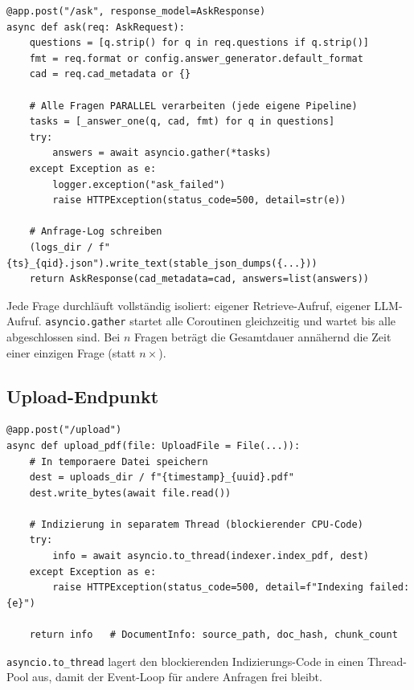 \documentclass[12pt, a4paper]{article}
\begin{document}
\begin{lstlisting}[style=pythonstyle, caption={Parallele Anfrageverarbeitung mit asyncio}]
@app.post("/ask", response_model=AskResponse)
async def ask(req: AskRequest):
    questions = [q.strip() for q in req.questions if q.strip()]
    fmt = req.format or config.answer_generator.default_format
    cad = req.cad_metadata or {}

    # Alle Fragen PARALLEL verarbeiten (jede eigene Pipeline)
    tasks = [_answer_one(q, cad, fmt) for q in questions]
    try:
        answers = await asyncio.gather(*tasks)
    except Exception as e:
        logger.exception("ask_failed")
        raise HTTPException(status_code=500, detail=str(e))

    # Anfrage-Log schreiben
    (logs_dir / f"{ts}_{qid}.json").write_text(stable_json_dumps({...}))
    return AskResponse(cad_metadata=cad, answers=list(answers))
\end{lstlisting}

\begin{infobox}
Jede Frage durchläuft vollständig isoliert: eigener Retrieve-Aufruf, eigener
LLM-Aufruf. \texttt{asyncio.gather} startet alle Coroutinen gleichzeitig und
wartet bis alle abgeschlossen sind. Bei $n$ Fragen beträgt die Gesamtdauer
annähernd die Zeit einer einzigen Frage (statt $n \times$).
\end{infobox}

\subsection{Upload-Endpunkt}

\begin{lstlisting}[style=pythonstyle, caption={PDF-Upload und Indizierung}]
@app.post("/upload")
async def upload_pdf(file: UploadFile = File(...)):
    # In temporaere Datei speichern
    dest = uploads_dir / f"{timestamp}_{uuid}.pdf"
    dest.write_bytes(await file.read())

    # Indizierung in separatem Thread (blockierender CPU-Code)
    try:
        info = await asyncio.to_thread(indexer.index_pdf, dest)
    except Exception as e:
        raise HTTPException(status_code=500, detail=f"Indexing failed: {e}")

    return info   # DocumentInfo: source_path, doc_hash, chunk_count
\end{lstlisting}

\texttt{asyncio.to\_thread} lagert den blockierenden Indizierungs-Code in einen
Thread-Pool aus, damit der Event-Loop für andere Anfragen frei bleibt.
\end{document}
